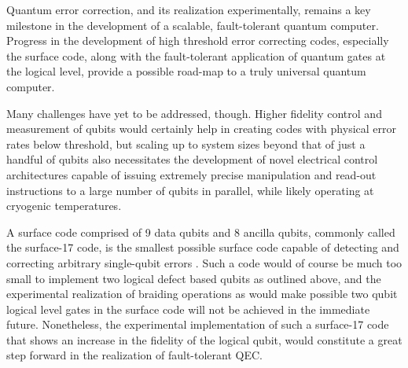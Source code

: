 Quantum error correction, and its realization experimentally, remains a key
milestone in the development of a scalable, fault-tolerant quantum computer.
Progress in the development of high threshold error correcting codes, especially
the surface code, along with the fault-tolerant application of quantum gates at
the logical level, provide a possible road-map to a truly universal quantum
computer.

Many challenges have yet to be addressed, though. Higher fidelity control and
measurement of qubits would certainly help in creating codes with physical error
rates below threshold, but scaling up to system sizes beyond that of just a
handful of qubits also necessitates the development of novel electrical control
architectures capable of issuing extremely precise manipulation and read-out
instructions to a large number of qubits in parallel, while likely operating at
cryogenic temperatures.

A surface code comprised of 9 data qubits and 8 ancilla qubits, commonly called
the surface-17 code, is the smallest possible surface code capable of detecting
and correcting arbitrary single-qubit errors
\cite{obrien17_densit_matrix_simul_small_surfac}. Such a code would of course be
much too small to implement two logical defect based qubits as outlined above,
and the experimental realization of braiding operations as would make possible
two qubit logical level gates in the surface code will not be achieved in the
immediate future. Nonetheless, the experimental implementation of such a
surface-17 code that shows an increase in the fidelity of the logical qubit,
would constitute a great step forward in the realization of fault-tolerant QEC.


